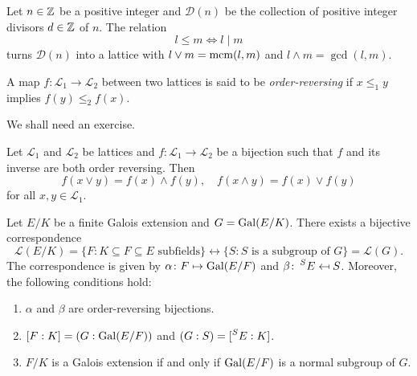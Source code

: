 \begin{example}
    Let $n \in \mathbb{Z}$ be a positive integer and $\mathcal{D}(n)$ be the collection of positive integer divisors $d \in \mathbb{Z}$ of $n$. The relation
    \[
    l \leq m \Longleftrightarrow l \mid m
    \]
    turns $\mathcal{D}(n)$ into a lattice with
    $l \vee m = \mathrm{mcm}(l,m)$ and $l \wedge m = \gcd(l,m)$.
\end{example}

A map $f\colon \mathcal{L}_1\to \mathcal{L}_2$ between two lattices is 
said to be \emph{order-reversing} if 
$x\leq_1 y$ implies $f(y)\leq_2 f(x)$. 

We shall need an exercise. 

\begin{exercise}
\label{xca:order_reversing}
    Let $\mathcal{L}_1$ and $\mathcal{L}_2$ be lattices and $f\colon \mathcal{L}_1\to \mathcal{L}_2$ be a bijection 
    such that $f$ and its inverse are both order reversing. Then 
    \[
    f(x\vee y)=f(x)\wedge f(y),\quad 
    f(x\wedge y)=f(x)\vee f(y)
    \]
    for all $x,y\in \mathcal{L}_1$. 
\end{exercise}



\begin{theorem}[Galois]
    Let $E/K$ be a finite Galois extension and $G=\operatorname{Gal}(E/K)$. 
    There exists a bijective correspondence
    \[
    \mathcal{L}(E/K)=\{F:K\subseteq F\subseteq E\text{ subfields}\}\leftrightarrow
    \{S:S\text{ is a subgroup of $G$}\}=\mathcal{L}(G). 
    \]
    The correspondence is given by $\alpha\colon F\mapsto \operatorname{Gal}(E/F)$ and 
    $\beta\colon \prescript{S}{}{E}\mapsfrom S$. Moreover, the following
    conditions hold:
    \begin{enumerate}
        \item $\alpha$ and $\beta$ are order-reversing bijections. 
        \item $[F:K]=(G:\operatorname{Gal}(E/F))$ and $(G:S)=[\prescript{S}{}{E}:K]$.
        \item $F/K$ is a Galois extension if and only if $\operatorname{Gal}(E/F)$ is a normal subgroup of $G$.        
    \end{enumerate}
\end{theorem}

